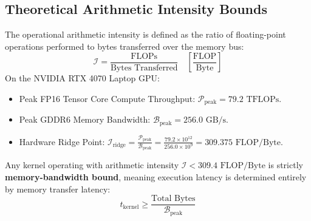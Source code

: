 \documentclass{article}
\begin{document}
\subsection{Theoretical Arithmetic Intensity Bounds}
The operational arithmetic intensity is defined as the ratio of floating-point operations performed to bytes transferred over the memory bus:
\begin{equation}
    \mathcal{I} = \frac{\text{FLOPs}}{\text{Bytes Transferred}} \quad \left[\frac{\text{FLOP}}{\text{Byte}}\right]
\end{equation}
On the NVIDIA RTX 4070 Laptop GPU:
\begin{itemize}
    \item Peak FP16 Tensor Core Compute Throughput: $\mathcal{P}_{\text{peak}} = 79.2 \text{ TFLOPs}$.
    \item Peak GDDR6 Memory Bandwidth: $\mathcal{B}_{\text{peak}} = 256.0 \text{ GB/s}$.
    \item Hardware Ridge Point: $\mathcal{I}_{\text{ridge}} = \frac{\mathcal{P}_{\text{peak}}}{\mathcal{B}_{\text{peak}}} = \frac{79.2 \times 10^{12}}{256.0 \times 10^9} = 309.375 \text{ FLOP/Byte}$.
\end{itemize}
Any kernel operating with arithmetic intensity $\mathcal{I} < 309.4 \text{ FLOP/Byte}$ is strictly \textbf{memory-bandwidth bound}, meaning execution latency is determined entirely by memory transfer latency:
\begin{equation}
    t_{\text{kernel}} \ge \frac{\text{Total Bytes}}{\mathcal{B}_{\text{peak}}}
\end{equation}
\end{document}
